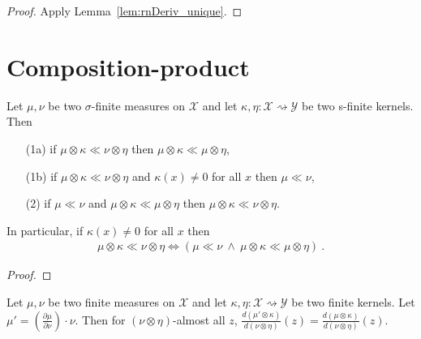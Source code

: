 \begin{proof} \leanok
{}
Apply Lemma~\ref{lem:rnDeriv_unique}.
\end{proof}



\section{Composition-product}


\begin{lemma}
  \label{lem:ac_compProd_iff}
  \leanok
  Let $\mu, \nu$ be two $\sigma$-finite measures on $\mathcal X$ and let $\kappa, \eta : \mathcal X \rightsquigarrow \mathcal Y$ be two s-finite kernels. Then
  \begin{itemize}
    \item[(1a)] if $\mu \otimes \kappa \ll \nu \otimes \eta$ then $\mu \otimes \kappa \ll \mu \otimes \eta$,
    \item[(1b)] if $\mu \otimes \kappa \ll \nu \otimes \eta$ and $\kappa(x) \ne 0$ for all $x$ then $\mu \ll \nu$,
    \item[(2)]  if $\mu \ll \nu$ and $\mu \otimes \kappa \ll \mu \otimes \eta$ then $\mu \otimes \kappa \ll \nu \otimes \eta$.
  \end{itemize}
  In particular, if $\kappa(x) \ne 0$ for all $x$ then
  \begin{align*}
  \mu \otimes \kappa \ll \nu \otimes \eta
  \iff \left( \mu \ll \nu \ \wedge \ \mu \otimes \kappa \ll \mu \otimes \eta \right)
  \: .
  \end{align*}
\end{lemma}

\begin{proof}\leanok
{}

\end{proof}


\begin{lemma}
  \label{lem:rnDeriv_eq_ac_left}
  \leanok
  \uses{}
  Let $\mu, \nu$ be two finite measures on $\mathcal X$ and let $\kappa, \eta : \mathcal X \rightsquigarrow \mathcal Y$ be two finite kernels.
  Let $\mu' = \left(\frac{\partial \mu}{\partial \nu}\right) \cdot \nu$.
  Then for $(\nu \otimes \eta)$-almost all $z$, $\frac{d (\mu' \otimes \kappa)}{d (\nu \otimes \eta)}(z) = \frac{d (\mu \otimes \kappa)}{d (\nu \otimes \eta)}(z)$.
\end{lemma}

